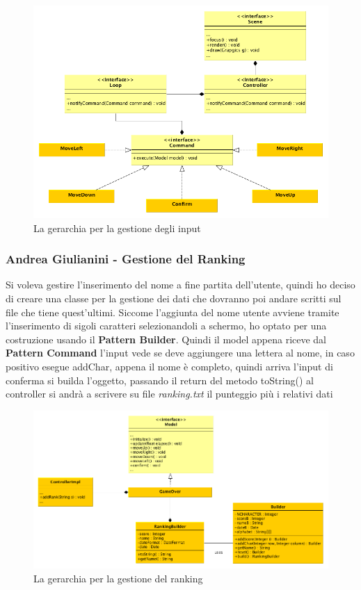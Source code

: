 \documentclass[a4paper,12pt, hidelinks]{report}
\begin{document}
\begin{figure}[H]
\centering{}
\includegraphics[width=\linewidth]{img/PatternCommand}
\caption{La gerarchia per la gestione degli input}
\label{img:GerarchiaSound}
\end{figure}

\begin{flushright}
\item\subsubsection{Andrea Giulianini - Gestione del Ranking}
\end{flushright}

Si voleva gestire l'inserimento del nome a fine partita dell'utente, quindi ho deciso di creare una classe per la gestione dei dati che dovranno poi andare scritti sul file che tiene quest'ultimi. Siccome l'aggiunta del nome utente avviene tramite l'inserimento di sigoli caratteri selezionandoli a schermo, ho optato per una costruzione usando il \textbf{Pattern Builder}. Quindi il model appena riceve dal \textbf{Pattern Command} l'input vede se deve aggiungere una lettera al nome, in caso positivo esegue addChar, appena il nome è completo, quindi arriva l'input di conferma si builda l'oggetto, passando il return del metodo toString() al controller si andrà a scrivere su file \emph{ranking.txt} il punteggio più i relativi dati

\begin{figure}[H]
\centering{}
\includegraphics[width=\linewidth]{img/PatternBuilder}
\caption{La gerarchia per la gestione del ranking}
\label{img:PatternBuilder}
\end{figure}
\end{document}
